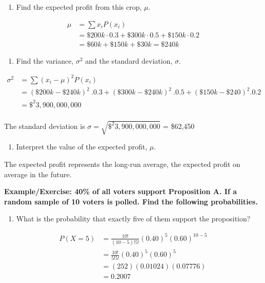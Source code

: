 \documentclass[
]{book}
\providecommand{\tightlist}{%
  \setlength{\itemsep}{0pt}\setlength{\parskip}{0pt}}
\begin{document}
\begin{enumerate}
\def\labelenumi{\arabic{enumi}.}
\setcounter{enumi}{1}
\tightlist
\item
  Find the expected profit from this crop, \(\mu\).
\end{enumerate}

\[
\begin{aligned}
\mu &= \sum{x_i}P(x_i) \\
    &= \$200k \cdot 0.3 + \$300k \cdot 0.5 + \$150k \cdot 0.2 \\
    &= \$60k + \$150k + \$30k = \$240k
\end{aligned}
\]

\begin{enumerate}
\def\labelenumi{\arabic{enumi}.}
\setcounter{enumi}{2}
\tightlist
\item
  Find the variance, \(\sigma^2\) and the standard deviation, \(\sigma\).
\end{enumerate}

\[
\begin{aligned}
\sigma^2 &= \sum(x_i-\mu)^2P(x_i) \\
&= (\$200k-\$240k)^2 \ . 0.3 + (\$300k-\$240k)^2 \ . 0.5 + (\$150k-\$240)^2 . 0.2 \\
&= \$^2 3,900, 000, 000 \\
\end{aligned}
\]

The standard deviation is \(\sigma = \sqrt{\$^2 3,900,000,000}\) = \$62,450

\begin{enumerate}
\def\labelenumi{\arabic{enumi}.}
\setcounter{enumi}{3}
\tightlist
\item
  Interpret the value of the expected profit, \(\mu\).
\end{enumerate}

The expected profit represents the long-run average, the expected profit on average in the future.

\textbf{Example/Exercise: 40\% of all voters support Proposition A. If a random sample of 10 voters is polled. Find the following probabilities.}

\begin{enumerate}
\def\labelenumi{\arabic{enumi}.}
\tightlist
\item
  What is the probability that exactly five of them support the proposition?
\end{enumerate}

\[
\begin{aligned}
P(X=5)&=\frac{10!}{(10-5)!5!}(0.40)^5(0.60)^{10-5} \\
&=\frac{10!}{5!5!}(0.40)^5(0.60)^5 \\
&=(252)(0.01024)(0.07776) \\
&=0.2007
\end{aligned}
\]
\end{document}
